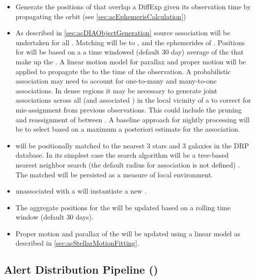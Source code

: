 \begin{itemize}
\item Generate the positions of \SSObjects that overlap a DiffExp given its observation time by propagating the \SSObject orbit (see \ref{sec:acEphemerisCalculation}) 
\item As described in \ref{sec:acDIAObjectGeneration} source association will be undertaken for all \DIASources. Matching will be to \DIAObjects, and the ephemerides of \SSObjects. Positions for \DIAObjects will be based on a a time windowed (default 30 day) average of the \DIASources that make up the \DIAObject. A linear motion model for parallax and proper motion will be applied to propagate the \DIAObject to the time of the observation. A probabilistic association may need to account for one-to-many and many-to-one associations.  In dense regions it may be necessary to generate joint associations across all \DIAObjects (and associated \DIASources) in the local  vicinity of a \DIASource to correct for mis-assignment from previous observations. This could include the pruning and reassignment of \DIASources between \DIAObjects. A baseline approach for nightly processing will be to select based on a maximum a posteriori estimate for the association.
\item \DIASources will be positionally matched to the nearest 3 stars and 3 galaxies in the DRP \Object database. In its simplest case the search algorithm will be a tree-based nearest neighbor search (the default radius for association is not defined) . The matched \Objects will be persisted as a measure of local environment. 
\item \DIASources unassociated with a \DIAObject will instantiate a new \DIAObject.
\item The aggregate positions for the \DIAObjects will be updated based on a rolling time window (default 30 days). 
\item Proper motion and parallax of the \DIAObject will be updated using a linear model as described in \ref{sec:acStellarMotionFitting}. 
\end{itemize}


\clearpage

\subsection{Alert Distribution Pipeline (\wbsAP)}

